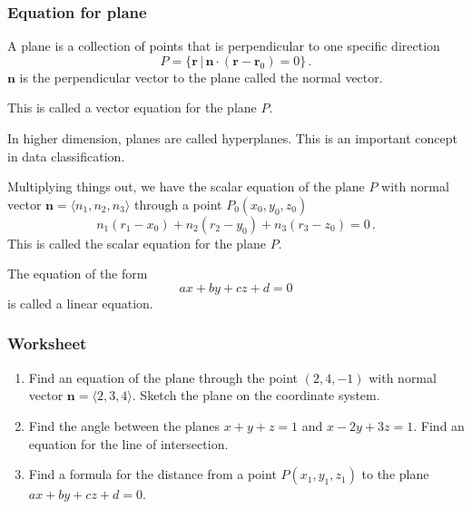 \documentclass[aspectratio=169]{beamer}
\newcommand{\vect}{\mathbf}
\begin{document}
\begin{frame}
    \frametitle{Equation for plane}
A plane is a collection of points that is perpendicular to one specific direction 
\begin{equation*}
    P = \{ \vect{r} \, | \, \vect{n} \cdot (\vect{r}- \vect{r}_0 ) = 0 \} \,.
\end{equation*}
$\vect{n}$ is the perpendicular vector to the plane called the normal vector.

This is called a vector equation for the plane $P$.

In higher dimension, planes are called hyperplanes.
This is an important concept in data classification.
\end{frame}

\begin{frame}
Multiplying things out, we have the scalar equation of the plane $P$ with 
normal vector $\vect{n} = \langle n_1, n_2, n_3 \rangle$ through a point $P_0(x_0, y_0, z_0)$
\begin{equation*}
    n_1(r_1- x_0) + n_2 (r_2 - y_0) + n_3(r_3 - z_0) = 0 \,.
\end{equation*}
This is called the scalar equation for the plane $P$.

The equation of the form
\begin{equation*}
    ax + by + cz + d = 0 
\end{equation*}
is called a linear equation.
\end{frame}

\begin{frame}
    \frametitle{Worksheet}
    \begin{enumerate}
        \item Find an equation of the plane through the point $(2,4,-1)$
            with normal vector $\vect{n} = \langle 2,3,4 \rangle$.
            Sketch the plane on the coordinate system.
        \item Find the angle between the planes $x+y+z = 1$ and 
            $x -2y + 3z =1$. Find an equation for the line of intersection.
        \item Find a formula for the distance from a point $P(x_1,y_1,z_1)$
            to the plane $ax +by + cz +d = 0 $.
    \end{enumerate}
\end{frame}
\end{document}
